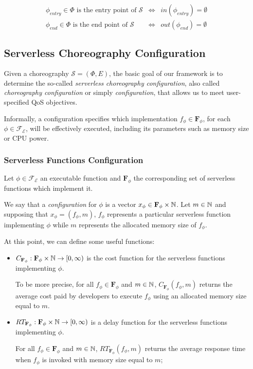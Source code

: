 \begin{eqnarray}
	\phi_{entry} \in \Phi \text{ is the entry point of } \mathcal{S} & \Leftrightarrow & in(\phi_{entry}) = \emptyset \\
	\phi_{end} \in \Phi \text{ is the end point of } \mathcal{S} & \Leftrightarrow & out(\phi_{end}) = \emptyset
\end{eqnarray}

\subsection{Serverless Choreography Configuration}

Given a choreography $\mathcal{S} = (\Phi,E)$, the basic goal of our framework is to determine the so-called \textit{serverless choreography configuration}, also called \textit{choreography configuration} or simply \textit{configuration}, that allows us to meet user-specified QoS objectives.

Informally, a configuration specifies which implementation $f_{\phi} \in \textbf{F}_{\phi}$, for each $\phi \in \mathscr{F_E}$, will be effectively executed, including its parameters such as memory size or CPU power.

\subsubsection{Serverless Functions Configuration}

Let $\phi \in \mathscr{F_E}$ an executable function and $\textbf{F}_{\phi}$ the corresponding set of serverless functions which implement it. 

We say that a \textit{configuration} for $\phi$ is a vector $x_{\phi} \in \textbf{F}_{\phi} \times \mathbb{N}$. Let $m \in \mathbb{N}$ and supposing that $x_{\phi} = (f_{\phi},m)$, $f_{\phi}$ represents a particular serverless function implementing $\phi$ while $m$ represents the allocated memory size of $f_{\phi}$.

At this point, we can define some useful functions:

\begin{itemize}	
	\item $C_{\textbf{F}_{\phi}} : \textbf{F}_{\phi} \times \mathbb{N} \to \left[ 0, \infty \right)$ is the cost function for the serverless functions implementing $\phi$.
	
	To be more precise, for all $f_{\phi} \in \textbf{F}_{\phi}$ and $m \in \mathbb{N}$, $C_{\textbf{F}_{\phi}}(f_{\phi}, m)$ returns the average cost paid by developers to execute $f_{\phi}$ using an allocated memory size equal to $m$.
	
	
	\item $RT_{\textbf{F}_{\phi}} : \textbf{F}_{\phi} \times \mathbb{N} \to \left[ 0, \infty \right)$ is a delay function for the serverless functions implementing $\phi$.
	
	For all $f_{\phi} \in \textbf{F}_{\phi}$ and $m \in \mathbb{N}$, $RT_{\textbf{F}_{\phi}}(f_{\phi}, m)$ returns the average response time when $f_{\phi}$ is invoked with memory size equal to $m$;
\end{itemize}


